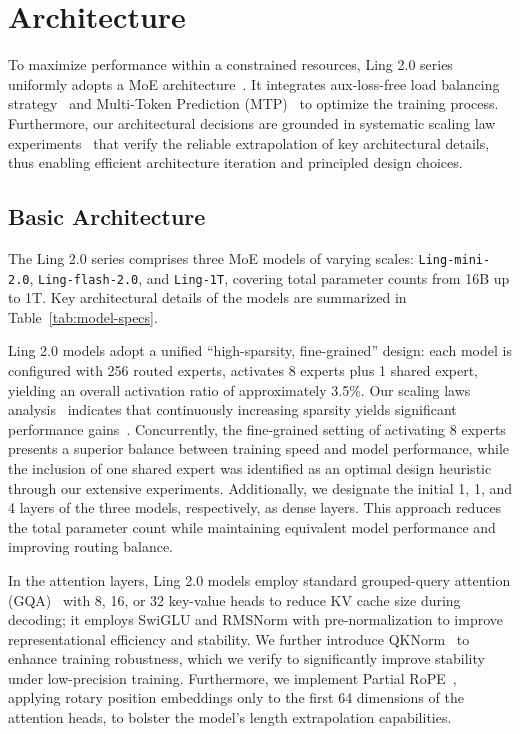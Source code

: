 
\section{Architecture}
\label{sec:Architecture}
To maximize performance within a constrained resources, Ling 2.0 series uniformly adopts a MoE architecture~\citep{shazeer2017outrageously,deepseekai2024deepseekv3technicalreport}. It integrates aux-loss-free load balancing strategy~\citep{deepseekai2024deepseekv3technicalreport} and Multi-Token Prediction (MTP)~\citep{gloeckle2024better,deepseekai2024deepseekv3technicalreport} to optimize the training process. Furthermore, our architectural decisions are grounded in systematic scaling law experiments~\citep{tian2025greaterleveragescalinglaws} that verify the reliable extrapolation of key architectural details, thus enabling efficient architecture iteration and principled design choices. 

\subsection{Basic Architecture}
\label{sec:basic_arch}
The Ling 2.0 series comprises three MoE models of varying scales: \texttt{Ling-mini-2.0}, \texttt{Ling-flash-2.0}, and \texttt{Ling-1T}, covering total parameter counts from 16B up to 1T. Key architectural details of the models are summarized in Table~\ref{tab:model-specs}.

Ling 2.0 models adopt a unified ``high-sparsity, fine-grained'' design: each model is configured with 256 routed experts, activates 8 experts plus 1 shared expert, yielding an overall activation ratio of approximately 3.5\%. Our scaling laws analysis~\citep{tian2025greaterleveragescalinglaws} indicates that continuously increasing sparsity yields significant performance gains~\citep{kimiK2}. Concurrently, the fine-grained setting of activating 8 experts presents a superior balance between training speed and model performance, while the inclusion of one shared expert was identified as an optimal design heuristic through our extensive experiments. Additionally, we designate the initial 1, 1, and 4 layers of the three models, respectively, as dense layers. This approach reduces the total parameter count while maintaining equivalent model performance and improving routing balance. 

In the attention layers, Ling 2.0 models employ standard grouped-query attention (GQA)~\citep{ainslie2023gqa} with 8, 16, or 32 key-value heads to reduce KV cache size during decoding; it employs SwiGLU and RMSNorm with pre-normalization to improve representational efficiency and stability. We further introduce QKNorm~\citep{henry2020query} to enhance training robustness, which we verify to significantly improve stability under low-precision training. Furthermore, we implement Partial RoPE~\citep{su2024roformer}, applying rotary position embeddings only to the first 64 dimensions of the attention heads, to bolster the model's length extrapolation capabilities. 

